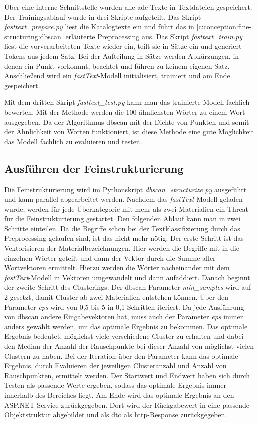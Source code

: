 Über eine interne Schnittstelle wurden alle \ac{ade}-Texte in Textdateien gespeichert. Der Trainingsablauf wurde in drei Skripte aufgeteilt. Das Skript \textit{fasttext\_prepare.py} liest die Katalogtexte ein und führt das in \autoref{c:conception:fine-structuring:dbscan} erläuterte Preprocessing aus.
Das Skript \textit{fasttext\_train.py} liest die vorverarbeiteten Texte wieder ein, teilt sie in Sätze ein und generiert Tokens aus jedem Satz. Bei der Aufteilung in Sätze werden Abkürzungen, in denen ein Punkt vorkommt, beachtet und führen zu keinem eigenen Satz. Anschließend wird ein \textit{fastText}-Modell initialisiert, trainiert und am Ende gespeichert.

Mit dem dritten Skript \textit{fasttext\_test.py} kann man das trainierte Modell fachlich bewerten. Mit der Methode  werden die 100 ähnlichsten Wörter zu einem Wort ausgegeben. Da der Algorithmus \ac{dbscan} mit der Dichte von Punkten und somit der \glqq Ähnlichkeit\grqq{} von Worten funktioniert, ist diese Methode eine gute Möglichkeit das Modell fachlich zu evaluieren und testen.

\subsection{Ausführen der Feinstrukturierung}
\label{c:implementation:clustering}
Die Feinstrukturierung wird im Pythonskript \textit{dbscan\_structurize.py} ausgeführt und kann parallel abgearbeitet werden. Nachdem das \textit{fastText}-Modell geladen wurde, werden für jede Überkategorie mit mehr als zwei Materialien ein Threat für die Feinstrukturierung gestartet. Den folgenden Ablauf kann man in zwei Schritte einteilen. Da die Begriffe schon bei der Textklassifizierung durch das Preprocessing gelaufen sind, ist das nicht mehr nötig. Der erste Schritt ist das Vektorisieren der Materialbezeichnungen. Hier werden die Begriffe mit  in die einzelnen Wörter geteilt und dann der Vektor durch die Summe aller Wortvektoren ermittelt. Hierzu werden die Wörter nacheinander mit dem \textit{fastText}-Modell in Vektoren umgewandelt und dann aufaddiert. Danach beginnt der zweite Schritt des Clusterings. Der \ac{dbscan}-Parameter \textit{min\_samples} wird auf 2 gesetzt, damit Cluster ab zwei Materialien entstehen können. Über den Parameter \textit{eps} wird von 0,5 bis 5 in 0,1-Schritten iteriert. Da jede Ausführung von \ac{dbscan} andere Eingabevektoren hat, muss auch der Parameter \textit{eps} immer anders gewählt werden, um das optimale Ergebnis zu bekommen. Das optimale Ergebnis bedeutet, möglichst viele verschiedene Cluster zu erhalten und dabei den Median der Anzahl der Rauschpunkte bei dieser Anzahl von möglichst vielen Clustern zu haben. Bei der Iteration über den Parameter kann das optimale Ergebnis, durch Evaluieren der jeweiligen Clusteranzahl und Anzahl von Rauschpunkten, ermittelt werden. Der Startwert und Endwert haben sich durch Testen als passende Werte ergeben, sodass das optimale Ergebnis immer innerhalb des Bereiches liegt. Am Ende wird das optimale Ergebnis an den ASP.NET Service zurückgegeben. Dort wird der Rückgabewert in eine passende Objektstruktur abgebildet und als \ac{dto} als \ac{http}-Response zurückgegeben.

